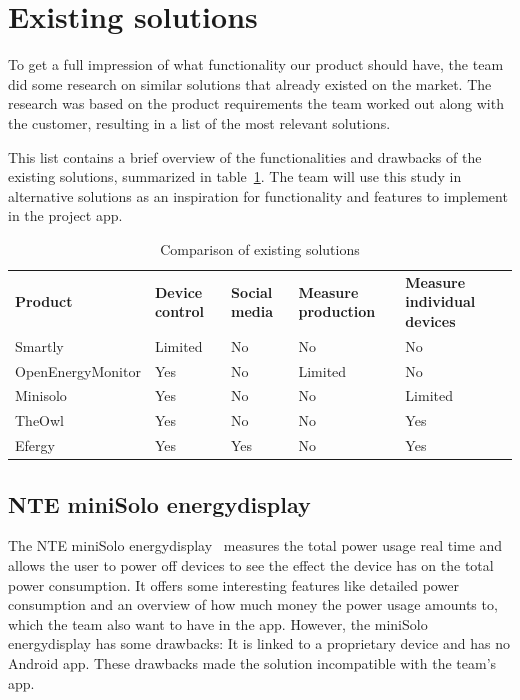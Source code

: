 \section{Existing solutions}
\label{sec:altsolution}

To get a full impression of what functionality our product should have, the team did some research on similar solutions that already existed on the market. The research was based on the product requirements the team worked out along with the customer, resulting in a list of the most relevant solutions.
 
This list contains a brief overview of the functionalities and drawbacks of the existing solutions, summarized in table~\ref{tab:existingSolutions}. The team will use this study in alternative solutions as an inspiration for functionality and features to implement in the project app.


\begin{table}[H]
\centering
{}
\begin{tabular}{|l|l|p{2.6cm}|p{2.3cm}|p{2.2cm}|}
\hline
\textbf{Product} & \textbf{Device control} & \textbf{Social media} & \textbf{Measure production} & \textbf{Measure individual devices} \\
Smartly & Limited & No  & No & No\\
OpenEnergyMonitor & Yes & No  & Limited & No \\
Minisolo & Yes & No  & No & Limited\\
TheOwl & Yes & No & No & Yes\\
Efergy & Yes & Yes &  No & Yes\\\hline
\end{tabular}
\caption{Comparison of existing solutions}
\label{tab:existingSolutions}
\end{table}


\subsection{NTE miniSolo energydisplay}

The NTE miniSolo energydisplay~\cite{nte} measures the total power usage real time and allows the user to power off devices to see the effect the device has on the total power consumption. It offers some interesting features like detailed power consumption and an overview of how much money the power usage amounts to, which the team also want to have in the app. However, the miniSolo energydisplay has some drawbacks: It is linked to a proprietary device and has no Android app. These drawbacks made the solution incompatible with the team's app.


